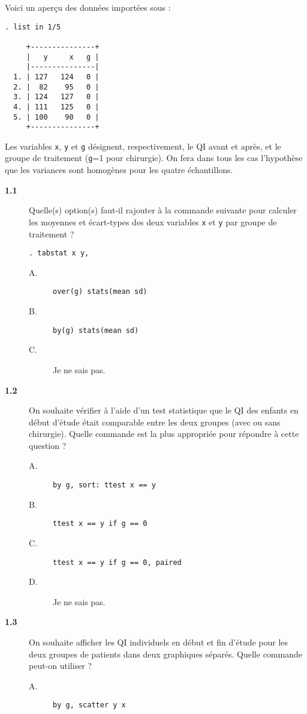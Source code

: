 Voici un aperçu des données importées sous \Stata :
\begin{verbatim}
. list in 1/5

     +---------------+
     |   y     x   g |
     |---------------|
  1. | 127   124   0 |
  2. |  82    95   0 |
  3. | 124   127   0 |
  4. | 111   125   0 |
  5. | 100    90   0 |
     +---------------+
\end{verbatim}
Les variables \texttt{x}, \texttt{y} et \texttt{g} désignent,
respectivement, le QI avant et après, et le groupe de traitement
(\texttt{g}=1 pour chirurgie). On fera dans tous les cas l'hypothèse que les
variances sont homogènes pour les quatre échantillons.
\begin{description}
\item[\bf 1.1] Quelle(s) option(s) faut-il rajouter à la commande suivante
  pour calculer les moyennes et écart-types des deux variables \texttt{x} et
  \texttt{y} par groupe de traitement ? 
\begin{verbatim}
. tabstat x y, 
\end{verbatim}
\begin{description}
\item[A.] \verb|over(g) stats(mean sd)|
\item[B.] \verb|by(g) stats(mean sd)|
\item[C.] Je ne sais pas.
\end{description}
\item[\bf 1.2] On souhaite vérifier à l'aide d'un test statistique que le QI
  des enfants en début d'étude était comparable entre les deux groupes (avec
  ou sans chirurgie). Quelle commande est la plus appropriée pour répondre à
  cette question ?  
\begin{description}
\item[A.] \verb|by g, sort: ttest x == y|
\item[B.] \verb|ttest x == y if g == 0|
\item[C.] \verb|ttest x == y if g == 0, paired|
\item[D.] Je ne sais pas.
\end{description}
\item[\bf 1.3] On souhaite afficher les QI individuels en début et fin
  d'étude pour les deux groupes de patients dans deux graphiques
  séparés. Quelle commande peut-on utiliser ? 
\begin{description}
\item[A.] \verb|by g, scatter y x|

\end{description}
\end{description}
